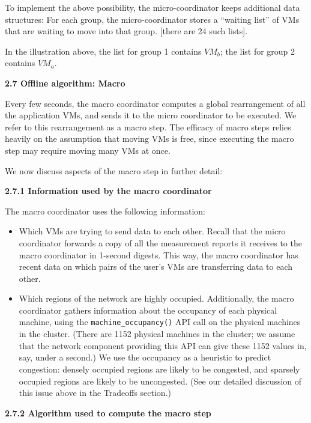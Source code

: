 \documentclass[11pt]{article}
\begin{document}
To implement the above possibility, the micro-coordinator keeps additional data structures:
For each group, the micro-coordinator stores a “waiting list” of VMs that are waiting to move into that group. [there are 24 such lists].

In the illustration above, the list for group 1 contains ${VM}_b$; the list for group 2 contains ${VM}_a$.

\FloatBarrier

\Large{\textbf{2.7 Offline algorithm: Macro}}

\normalsize
Every few seconds, the macro coordinator computes a global rearrangement of all the application VMs, and sends it to the micro coordinator to be executed.  We refer to this rearrangement as a macro step.  The efficacy of macro steps relies heavily on the assumption that moving VMs is free, since executing the macro step may require moving many VMs at once.

We now discuss aspects of the macro step in further detail:

\large{\textbf{2.7.1 Information used by the macro coordinator}}

\normalsize
The macro coordinator uses the following information:

\vspace{-4mm}
\begin{itemize}
  \item 
Which VMs are trying to send data to each other.  Recall that the micro coordinator forwards a copy of all the measurement reports it receives to the macro coordinator in 1-second digests.  This way, the macro coordinator has recent data on which pairs of the user's VMs are transferring data to each other.
  \item
  Which regions of the network are highly occupied.  Additionally, the macro coordinator gathers information about the occupancy of each physical machine, using the \Verb"machine_occupancy()" API call on the physical machines in the cluster.  (There are 1152 physical machines in the cluster; we assume that the network component providing this API can give these 1152 values in, say, under a second.)   We use the occupancy as a heuristic to predict congestion: densely occupied regions are likely to be congested, and sparsely occupied regions are likely to be uncongested.  (See our detailed discussion of this issue above in the Tradeoffs section.)
  
\end{itemize}


\large{\textbf{2.7.2 Algorithm used to compute the macro step}}
\end{document}
